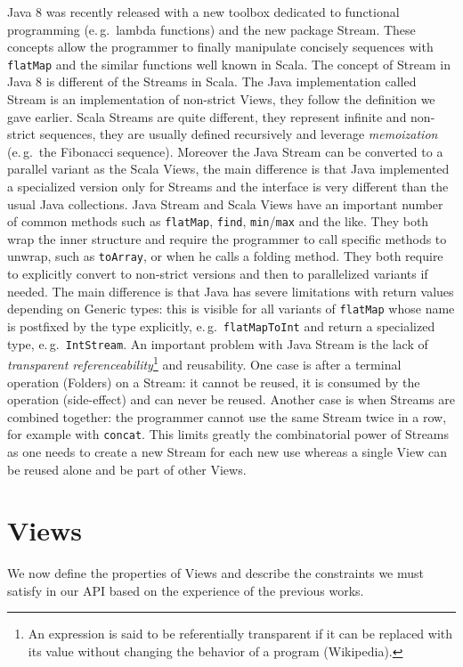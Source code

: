 \documentclass[a4paper,12pt,twocolumn]{article}
\newcommand{\eg}{e.\,g.\ }
\begin{document}
Java 8 was recently released with a new toolbox dedicated to functional programming (\eg lambda functions) and the new package Stream.
These concepts allow the programmer to finally manipulate concisely sequences with \verb|flatMap| and the similar functions well known in Scala.
The concept of Stream in Java 8 is different of the Streams in Scala.
The Java implementation called Stream is an implementation of non-strict Views, they follow the definition we gave earlier.
Scala Streams are quite different, they represent infinite and non-strict sequences, they are usually defined recursively and leverage {\it memoization}\/ (\eg the Fibonacci sequence).
Moreover the Java Stream can be converted to a parallel variant as the Scala Views, the main difference is that Java implemented a specialized version only for Streams and the interface is very different than the usual Java collections.
Java Stream and Scala Views have an important number of common methods such as \verb|flatMap|, \verb|find|, \verb|min|/\verb|max| and the like.
They both wrap the inner structure and require the programmer to call specific methods to unwrap, such as \verb|toArray|, or when he calls a folding method.
They both require to explicitly convert to non-strict versions and then to parallelized variants if needed.
The main difference is that Java has severe limitations with return values depending on Generic types: this is visible for all variants of \verb|flatMap| whose name is postfixed by the type explicitly, \eg \verb|flatMapToInt| and return a specialized type, \eg \verb|IntStream|.
An important problem with Java Stream is the lack of {\it transparent referenceability}\footnote{An expression is said to be referentially transparent if it can be replaced with its value without changing the behavior of a program (Wikipedia).} and reusability.
One case is after a terminal operation (Folders) on a Stream: it cannot be reused, it is consumed by the operation (side-effect) and can never be reused.
Another case is when Streams are combined together: the programmer cannot use the same Stream twice in a row, for example with \verb|concat|.
This limits greatly the combinatorial power of Streams as one needs to create a new Stream for each new use whereas a single View can be reused alone and be part of other Views.

\section{Views}
We now define the properties of Views and describe the constraints we must satisfy in our API based on the experience of the previous works.
\end{document}
